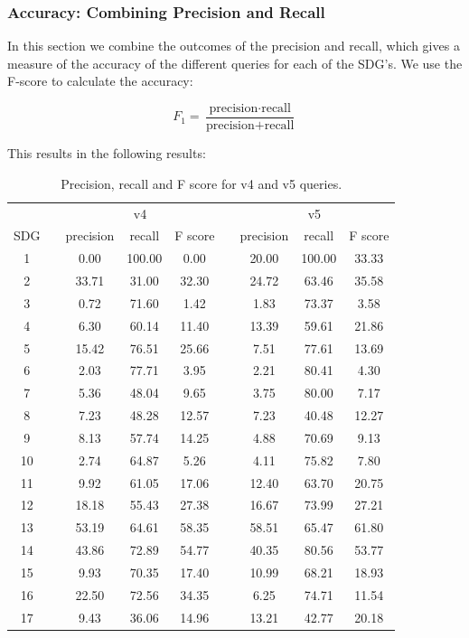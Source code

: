 \documentclass{article}
\begin{document}
\subsubsection{Accuracy: Combining Precision and Recall}
In this section we combine the outcomes of the precision and recall, which gives a measure of the accuracy of the different queries for each of the SDG's. We use the F-score to calculate the accuracy:

\begin{equation*}
    F_1 = \frac{\text{precision}\cdot\text{recall}}{\text{precision}+\text{recall}}
\end{equation*}

This results in the following results:

\begin{table}[H]
\centering 
\begin{tabular}{c c ccc c ccc}
\toprule
&&\multicolumn{3}{c}{v4}&&\multicolumn{3}{c}{v5}\\
\cline{3-5} \cline{7-9}
SDG && precision & recall & F score && precision & recall & F score \\
 \hline
 1 && 0.00 & 100.00 & 0.00 && 20.00 & 100.00 & 33.33 \\
 2 && 33.71 & 31.00 & 32.30 && 24.72 & 63.46 & 35.58 \\
 3 && 0.72 & 71.60 & 1.42 && 1.83 & 73.37 & 3.58 \\
 4 && 6.30 & 60.14 & 11.40 && 13.39 & 59.61 & 21.86 \\
 5 && 15.42 & 76.51 & 25.66 && 7.51 & 77.61 & 13.69 \\
 6 && 2.03 & 77.71 & 3.95 && 2.21 & 80.41 & 4.30 \\
 7 && 5.36 & 48.04 & 9.65 && 3.75 & 80.00 & 7.17 \\
 8 && 7.23 & 48.28 & 12.57 && 7.23 & 40.48 & 12.27 \\
 9 && 8.13 & 57.74 & 14.25 && 4.88 & 70.69 & 9.13 \\
 10 && 2.74 & 64.87 & 5.26 && 4.11 & 75.82 & 7.80 \\
 11 && 9.92 & 61.05 & 17.06 && 12.40 & 63.70 & 20.75 \\
 12 && 18.18 & 55.43 & 27.38 && 16.67 & 73.99 & 27.21 \\
 13 && 53.19 & 64.61 & 58.35 && 58.51 & 65.47 & 61.80 \\
 14 && 43.86 & 72.89 & 54.77 && 40.35 & 80.56 & 53.77 \\
 15 && 9.93 & 70.35 & 17.40 && 10.99 & 68.21 & 18.93 \\
 16 && 22.50 & 72.56 & 34.35 && 6.25 & 74.71 & 11.54 \\
 17 && 9.43 & 36.06 & 14.96 && 13.21 & 42.77 & 20.18 \\
 \bottomrule
\end{tabular}
\caption{Precision, recall and F score for v4 and v5 queries.}
\label{precisiondatatab}
\end{table}
\end{document}

